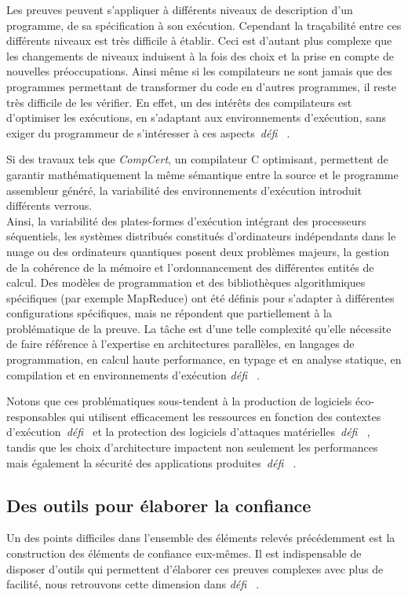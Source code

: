 \documentclass[11pt]{article}
\newcommand{\defi}[1]{\emph{défi~%
\cite{#1}}}
\begin{document}
Les preuves peuvent s'appliquer à différents niveaux de description d'un programme, de sa spécification à son exécution. 
Cependant la traçabilité entre ces différents niveaux est très difficile à établir. Ceci est d'autant plus complexe que les changements de niveaux induisent à la fois des choix et la prise en compte de nouvelles préoccupations.
Ainsi même si les compilateurs ne sont jamais que des programmes permettant de transformer du code en d'autres programmes, il reste très difficile de les vérifier. En effet, un des intérêts des compilateurs est d'optimiser les exécutions, en s'adaptant aux environnements d'exécution, sans exiger du programmeur de s'intéresser à ces aspects~\defi{Monniaux}.

Si des travaux tels que \textit{CompCert}, un compilateur C optimisant, permettent de garantir mathématiquement la même sémantique entre la source et le programme assembleur généré, la variabilité des environnements d'exécution introduit différents verrous. \\
Ainsi, la variabilité des  plates-formes d'exécution intégrant des processeurs séquentiels, les systèmes distribués constitués d'ordinateurs indépendants dans le nuage ou des ordinateurs quantiques posent  deux problèmes majeurs, la gestion de la cohérence de la mémoire et l'ordonnancement des différentes entités de calcul. Des modèles de programmation et des bibliothèques algorithmiques spécifiques (par exemple MapReduce) ont été définis pour s'adapter à différentes configurations spécifiques, mais ne répondent que partiellement à la problématique de la preuve. La tâche est d'une telle complexité qu'elle nécessite de faire référence à l'expertise en architectures parallèles, en langages de programmation, en calcul haute performance, en typage et en analyse statique, en compilation et en environnements d'exécution \defi{compilation}.

Notons que ces problématiques sous-tendent à la production de logiciels éco-responsables qui utilisent efficacement les ressources en fonction des contextes d'exécution~\defi{vert} et la protection des logiciels d'attaques matérielles~\defi{Monniaux}, tandis que les choix d'architecture impactent non seulement les performances mais également la sécurité des applications produites~\defi{securite}.




\subsection{Des outils pour élaborer la confiance \label{ss:fiabilite:confiance}}
Un des points difficiles dans l'ensemble des éléments relevés précédemment est la construction des éléments de confiance eux-mêmes. Il est indispensable de disposer d'outils qui permettent d'élaborer ces preuves complexes avec plus de facilité, nous retrouvons cette dimension dans \defi{Monniaux, reconfiguration}.  
\end{document}
